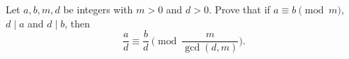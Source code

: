 Let $a,b,m,d$ be integers with $m>0$ and $d>0$. Prove that if $a\equiv b\pmod m$, $d\mid a$ and $d\mid b$, then
\[\dfrac {a}{d}\equiv\dfrac {b}{d}\pmod{\dfrac{m}{\gcd(d,m)}}.\]
